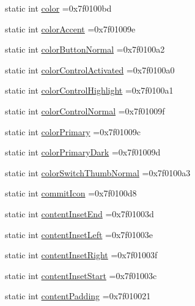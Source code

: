 \begin{DoxyCompactItemize}
static int \hyperlink{classandroid_1_1support_1_1design_1_1R_1_1attr_ac4692721eae257ed767bb464917446de}{color} =0x7f0100bd
\item 
static int \hyperlink{classandroid_1_1support_1_1design_1_1R_1_1attr_a34c84599954f6b50d417431a1fc96ff5}{color\+Accent} =0x7f01009e
\item 
static int \hyperlink{classandroid_1_1support_1_1design_1_1R_1_1attr_a9aab1b1f5f5e55e485569f56f4a23d6c}{color\+Button\+Normal} =0x7f0100a2
\item 
static int \hyperlink{classandroid_1_1support_1_1design_1_1R_1_1attr_aa2f7d231aef973a9d4c53d7e334f5467}{color\+Control\+Activated} =0x7f0100a0
\item 
static int \hyperlink{classandroid_1_1support_1_1design_1_1R_1_1attr_acdaa061c93eac490ef28917ae15d14c6}{color\+Control\+Highlight} =0x7f0100a1
\item 
static int \hyperlink{classandroid_1_1support_1_1design_1_1R_1_1attr_a19fe8c83cad1d93f29836a533b5011d6}{color\+Control\+Normal} =0x7f01009f
\item 
static int \hyperlink{classandroid_1_1support_1_1design_1_1R_1_1attr_a541d0b27b3a34127103b8de1fcb27da8}{color\+Primary} =0x7f01009c
\item 
static int \hyperlink{classandroid_1_1support_1_1design_1_1R_1_1attr_a1014705e54c4e0b7ae9a29b8116f1124}{color\+Primary\+Dark} =0x7f01009d
\item 
static int \hyperlink{classandroid_1_1support_1_1design_1_1R_1_1attr_a64c4b3a099566cfb653a1354c14bc4dd}{color\+Switch\+Thumb\+Normal} =0x7f0100a3
\item 
static int \hyperlink{classandroid_1_1support_1_1design_1_1R_1_1attr_ae2e4fb1b24069509fc70fec10a60810f}{commit\+Icon} =0x7f0100d8
\item 
static int \hyperlink{classandroid_1_1support_1_1design_1_1R_1_1attr_a344dc4ed8f3a982023c3679ecac0347f}{content\+Inset\+End} =0x7f01003d
\item 
static int \hyperlink{classandroid_1_1support_1_1design_1_1R_1_1attr_a158a78f4136ee86acfbc3de6d947ee1c}{content\+Inset\+Left} =0x7f01003e
\item 
static int \hyperlink{classandroid_1_1support_1_1design_1_1R_1_1attr_a6491aa248894c7643f5e77a4a345066c}{content\+Inset\+Right} =0x7f01003f
\item 
static int \hyperlink{classandroid_1_1support_1_1design_1_1R_1_1attr_ad3756cf8d5e48c3ed37e110730040fc9}{content\+Inset\+Start} =0x7f01003c
\item 
static int \hyperlink{classandroid_1_1support_1_1design_1_1R_1_1attr_ade364e02c1282d837b631e217bb67d9d}{content\+Padding} =0x7f010021

\end{DoxyCompactItemize}
